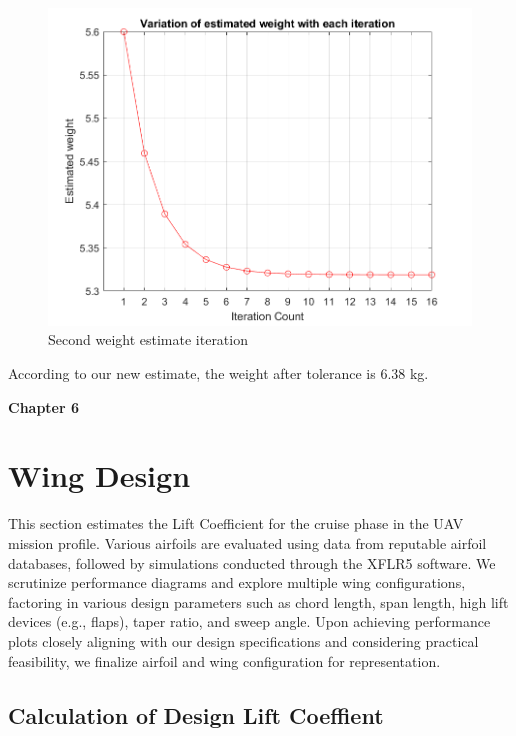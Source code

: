 \documentclass[12 pt]{article}
\begin{document}
\begin{figure}[h]
    \centering
    \includegraphics[width=1.0\linewidth]{Codes//Week 2/weight_2.png}
    \caption{Second weight estimate iteration}
    \label{Second weight estimate iteration}
\end{figure}

According to our new estimate, the weight after tolerance is 6.38 kg.

\afterpage{\clearpage}
\newpage

\textbf{\Huge{Chapter 6}}
\section{Wing Design}
This section estimates the Lift Coefficient for the cruise phase in the UAV mission profile. Various airfoils are evaluated using data from reputable airfoil databases, followed by simulations conducted through the XFLR5 software. We scrutinize performance diagrams and explore multiple wing configurations, factoring in various design parameters such as chord length, span length, high lift devices (e.g., flaps), taper ratio, and sweep angle. Upon achieving performance plots closely aligning with our design specifications and considering practical feasibility, we finalize airfoil and wing configuration for representation.
\vspace{5mm} 
 

\color{red}
\subsection{\large Calculation of Design Lift Coeffient}
\end{document}
